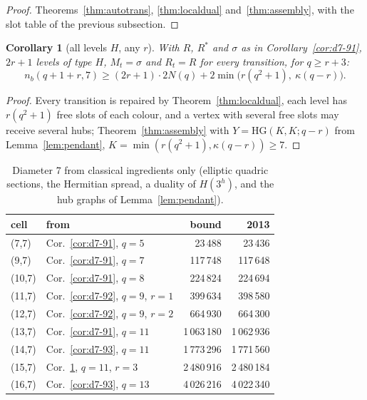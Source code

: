 \documentclass[11pt]{amsart}
\newtheorem{corollary}[theorem]{Corollary}
\theoremstyle{definition}
\theoremstyle{remark}
\numberwithin{equation}{section}
\newcommand{\nb}{n_b}
\begin{document}
\begin{proof}
Theorems~\ref{thm:autotrans}, \ref{thm:localdual} and~\ref{thm:assembly}, with the slot table of the previous subsection.
\end{proof}

\begin{corollary}[all levels $H$, any $r$]\label{cor:d7-r}
With $R$, $R^*$ and $\sigma$ as in Corollary~\ref{cor:d7-91}, $2r+1$ levels of type $H$, $M_t=\sigma$ and $R_t=R$ for every
transition, for $q\ge r+3$:
\[
\nb(q+1+r,7)\ge(2r+1)\cdot2N(q)+2\min\bigl(r(q^2+1),\ \kappa(q-r)\bigr).
\]
\end{corollary}

\begin{proof}
Every transition is repaired by Theorem~\ref{thm:localdual}, each level has $r(q^2+1)$ free slots of each colour, and a
vertex with several free slots may receive several hubs; Theorem~\ref{thm:assembly} with $Y=\mathrm{HG}(K,K;q-r)$ from
Lemma~\ref{lem:pendant}, $K=\min(r(q^2+1),\kappa(q-r))\ge7$.
\end{proof}

\begin{table}[ht]
\caption{Diameter 7 from classical ingredients only (elliptic quadric sections, the Hermitian spread, a duality of
$H(3^h)$, and the hub graphs of Lemma~\ref{lem:pendant}).}\label{tab:d7general}
\begin{tabular}{@{}l l r r@{}}
\toprule cell & from & bound & 2013 \\ \midrule
(7,7) & Cor.~\ref{cor:d7-91}, $q=5$ & 23\,488 & 23\,436\\
(9,7) & Cor.~\ref{cor:d7-91}, $q=7$ & 117\,748 & 117\,648\\
(10,7) & Cor.~\ref{cor:d7-91}, $q=8$ & 224\,824 & 224\,694\\
(11,7) & Cor.~\ref{cor:d7-92}, $q=9$, $r=1$ & 399\,634 & 398\,580\\
(12,7) & Cor.~\ref{cor:d7-92}, $q=9$, $r=2$ & 664\,930 & 664\,300\\
(13,7) & Cor.~\ref{cor:d7-91}, $q=11$ & 1\,063\,180 & 1\,062\,936\\
(14,7) & Cor.~\ref{cor:d7-93}, $q=11$ & 1\,773\,296 & 1\,771\,560\\
(15,7) & Cor.~\ref{cor:d7-r}, $q=11$, $r=3$ & 2\,480\,916 & 2\,480\,184\\
(16,7) & Cor.~\ref{cor:d7-93}, $q=13$ & 4\,026\,216 & 4\,022\,340\\ \bottomrule
\end{tabular}
\end{table}
\end{document}
